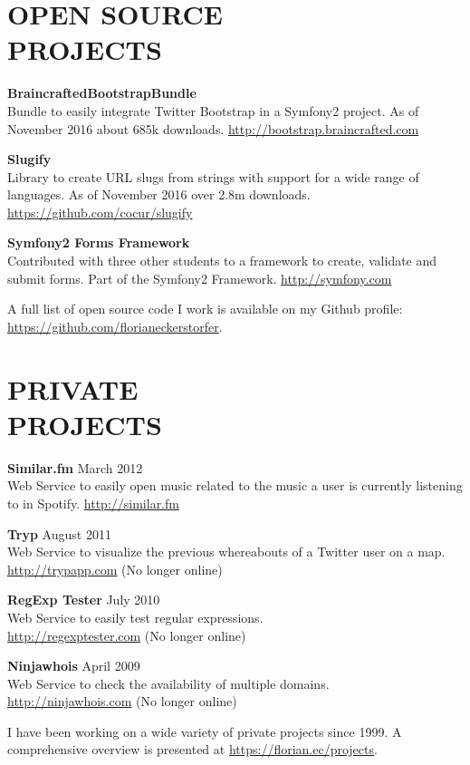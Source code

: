 \documentclass[margin]{res}
\begin{document}
\begin{resume}
\section{OPEN SOURCE \\ PROJECTS}

\textbf{BraincraftedBootstrapBundle} \\
  Bundle to easily integrate Twitter Bootstrap in a Symfony2 project. As of November 2016 about 685k downloads. \url{http://bootstrap.braincrafted.com}

\textbf{Slugify} \\
  Library to create URL slugs from strings with support for a wide range of languages. As of November 2016 over 2.8m downloads. \url{https://github.com/cocur/slugify}

\textbf{Symfony2 Forms Framework} \\
  Contributed with three other students to a framework to create, validate and submit forms. Part of the Symfony2 Framework. \url{http://symfony.com}

A full list of open source code I work is available on my Github profile: \url{https://github.com/florianeckerstorfer}.

\section{PRIVATE \\ PROJECTS}

\textbf{Similar.fm} \hfill March 2012 \\
  Web Service to easily open music related to the music a user is currently listening to in Spotify. \url{http://similar.fm}

\textbf{Tryp} \hfill August 2011 \\
  Web Service to visualize the previous whereabouts of a Twitter user on a map. \\ \url{http://trypapp.com} (No longer online)

\textbf{RegExp Tester} \hfill July 2010 \\
  Web Service to easily test regular expressions. \\ \url{http://regexptester.com} (No longer online)

\textbf{Ninjawhois} \hfill April 2009 \\
  Web Service to check the availability of multiple domains. \\ \url{http://ninjawhois.com} (No longer online)

I have been working on a wide variety of private projects since 1999. A comprehensive overview is presented at \url{https://florian.ec/projects}.



\end{resume}
\end{document}
